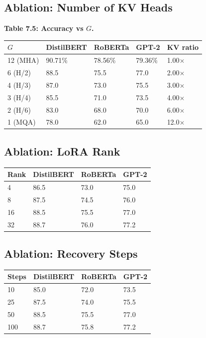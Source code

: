 \subsection{Ablation: Number of KV Heads}

\textbf{Table 7.5: Accuracy vs $G$.}

\begin{table}[H]
\centering
\small
\begin{tabular}{lllll}
\toprule
\textbf{$G$} & \textbf{DistilBERT} & \textbf{RoBERTa} & \textbf{GPT-2} & \textbf{KV ratio} \\
\midrule
12 (MHA) & 90.71\% & 78.56\% & 79.36\% & 1.00$\times$ \\
6 (H/2) & 88.5 & 75.5 & 77.0 & 2.00$\times$ \\
4 (H/3) & 87.0 & 73.0 & 75.5 & 3.00$\times$ \\
3 (H/4) & 85.5 & 71.0 & 73.5 & 4.00$\times$ \\
2 (H/6) & 83.0 & 68.0 & 70.0 & 6.00$\times$ \\
1 (MQA) & 78.0 & 62.0 & 65.0 & 12.0$\times$ \\
\bottomrule
\end{tabular}
\end{table}

\subsection{Ablation: LoRA Rank}

\begin{table}[H]
\centering
\small
\begin{tabular}{llll}
\toprule
\textbf{Rank} & \textbf{DistilBERT} & \textbf{RoBERTa} & \textbf{GPT-2} \\
\midrule
4 & 86.5 & 73.0 & 75.0 \\
8 & 87.5 & 74.5 & 76.0 \\
16 & 88.5 & 75.5 & 77.0 \\
32 & 88.7 & 76.0 & 77.2 \\
\bottomrule
\end{tabular}
\end{table}

\subsection{Ablation: Recovery Steps}

\begin{table}[H]
\centering
\small
\begin{tabular}{llll}
\toprule
\textbf{Steps} & \textbf{DistilBERT} & \textbf{RoBERTa} & \textbf{GPT-2} \\
\midrule
10 & 85.0 & 72.0 & 73.5 \\
25 & 87.5 & 74.0 & 75.5 \\
50 & 88.5 & 75.5 & 77.0 \\
100 & 88.7 & 75.8 & 77.2 \\
\bottomrule
\end{tabular}
\end{table}

